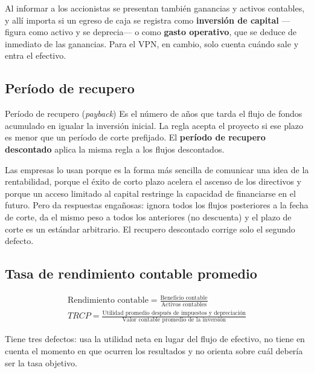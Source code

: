 Al informar a los accionistas se presentan también ganancias y activos contables, y allí importa si un egreso de caja se registra como \textbf{inversión de capital} —figura como activo y se deprecia— o como \textbf{gasto operativo}, que se deduce de inmediato de las ganancias. Para el VPN, en cambio, solo cuenta cuándo sale y entra el efectivo.

\subsection{Período de recupero}

\begin{definicion}{Período de recupero (\emph{payback})}
Es el número de años que tarda el flujo de fondos acumulado en igualar la inversión inicial. La regla acepta el proyecto si ese plazo es menor que un período de corte prefijado. El \textbf{período de recupero descontado} aplica la misma regla a los flujos descontados.
\end{definicion}

Las empresas lo usan porque es la forma más sencilla de comunicar una idea de la rentabilidad, porque el éxito de corto plazo acelera el ascenso de los directivos y porque un acceso limitado al capital restringe la capacidad de financiarse en el futuro. Pero da respuestas engañosas: ignora todos los flujos posteriores a la fecha de corte, da el mismo peso a todos los anteriores (no descuenta) y el plazo de corte es un estándar arbitrario. El recupero descontado corrige solo el segundo defecto.

\subsection{Tasa de rendimiento contable promedio}

\begin{formulaBox}
\[
\begin{gathered}
\text{Rendimiento contable} = \frac{\text{Beneficio contable}}{\text{Activos contables}}
\\[4pt]
TRCP = \frac{\text{Utilidad promedio después de impuestos y depreciación}}{\text{Valor contable promedio de la inversión}}
\end{gathered}
\]
\end{formulaBox}

Tiene tres defectos: usa la utilidad neta en lugar del flujo de efectivo, no tiene en cuenta el momento en que ocurren los resultados y no orienta sobre cuál debería ser la tasa objetivo.

